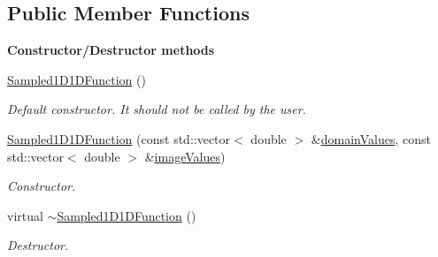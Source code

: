 \subsection*{Public Member Functions}
\begin{Indent}{\bf Constructor/\-Destructor methods}\par
\begin{DoxyCompactItemize}
\item 
\hyperlink{class_q_u_e_s_o_1_1_sampled1_d1_d_function_acb53ff4fd590cea97f4ce2101f68f2a3}{Sampled1\-D1\-D\-Function} ()
\begin{DoxyCompactList}\small\item\em Default constructor. It should not be called by the user. \end{DoxyCompactList}\item 
\hyperlink{class_q_u_e_s_o_1_1_sampled1_d1_d_function_a2c9c2dbdee05fb49c6d80f3e72c49a04}{Sampled1\-D1\-D\-Function} (const std\-::vector$<$ double $>$ \&\hyperlink{class_q_u_e_s_o_1_1_sampled1_d1_d_function_ae3ece65039bde30a1392c479ad9b9a1c}{domain\-Values}, const std\-::vector$<$ double $>$ \&\hyperlink{class_q_u_e_s_o_1_1_sampled1_d1_d_function_a2354fe46fe075637a85998e1a4f2d64d}{image\-Values})
\begin{DoxyCompactList}\small\item\em Constructor. \end{DoxyCompactList}\item 
virtual \hyperlink{class_q_u_e_s_o_1_1_sampled1_d1_d_function_a2d67b2e2e0c95555b4f22a5fcec928c9}{$\sim$\-Sampled1\-D1\-D\-Function} ()
\begin{DoxyCompactList}\small\item\em Destructor. \end{DoxyCompactList}\end{DoxyCompactItemize}
\end{Indent}

